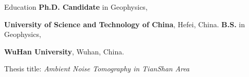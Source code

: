 \begin{rubric}{Education}
\entry*[2017 -- present]
    \textbf{Ph.D. Candidate} in Geophysics,
    \par\textbf{University of Science and Technology of China}, Hefei, China.
\entry*[2013 -- 2017]%
    \textbf{B.S.} in Geophysics,
    \par\textbf{WuHan University}, Wuhan, China.
	\par Thesis title: \emph{Ambient Noise Tomography in TianShan Area}
\end{rubric}

